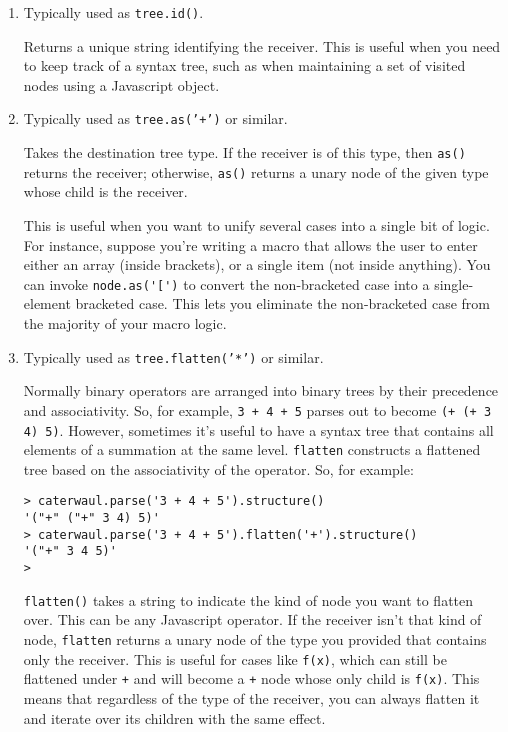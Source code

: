 \documentclass{report}
\begin{document}
\begin{enumerate}
\item[{\tt id}]
  Typically used as {\tt tree.id()}.

  Returns a unique string identifying the receiver. This is useful when you need to keep track of a syntax tree, such as when maintaining a set of visited nodes using a Javascript
  object.

\item[{\tt as}]
  Typically used as {\tt tree.as('+')} or similar.

  Takes the destination tree type. If the receiver is of this type, then {\tt as()} returns the receiver; otherwise, {\tt as()} returns a unary node of the given type whose child is the
  receiver.

  This is useful when you want to unify several cases into a single bit of logic. For instance, suppose you're writing a macro that allows the user to enter either an array (inside
  brackets), or a single item (not inside anything). You can invoke \verb|node.as('[')| to convert the non-bracketed case into a single-element bracketed case. This lets you eliminate
  the non-bracketed case from the majority of your macro logic.

\item[{\tt flatten}]
  Typically used as {\tt tree.flatten('*')} or similar.

  Normally binary operators are arranged into binary trees by their precedence and associativity. So, for example, {\tt 3 + 4 + 5} parses out to become \verb|(+ (+ 3 4) 5)|. However,
  sometimes it's useful to have a syntax tree that contains all elements of a summation at the same level. {\tt flatten} constructs a flattened tree based on the associativity of the
  operator. So, for example:

\begin{verbatim}
> caterwaul.parse('3 + 4 + 5').structure()
'("+" ("+" 3 4) 5)'
> caterwaul.parse('3 + 4 + 5').flatten('+').structure()
'("+" 3 4 5)'
>
\end{verbatim}

  {\tt flatten()} takes a string to indicate the kind of node you want to flatten over. This can be any Javascript operator. If the receiver isn't that kind of node, {\tt flatten}
  returns a unary node of the type you provided that contains only the receiver. This is useful for cases like {\tt f(x)}, which can still be flattened under {\tt +} and will become a
  {\tt +} node whose only child is {\tt f(x)}. This means that regardless of the type of the receiver, you can always flatten it and iterate over its children with the same effect.


\end{enumerate}
\end{document}
